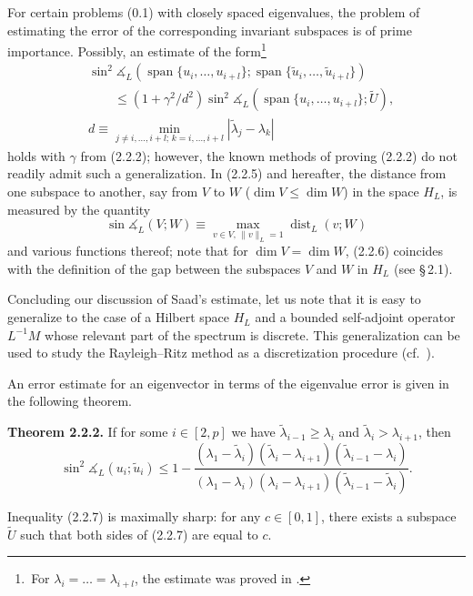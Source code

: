 \documentclass[11pt,oneside]{book}
\newcommand{\myspan}{\operatorname{span}}
\newcommand{\ang}{\measuredangle}
\begin{document}
For certain problems (0.1) with closely spaced eigenvalues, the problem of estimating the error of the corresponding invariant subspaces is of prime importance. %
Possibly, an estimate of the form\begingroup\renewcommand{\thefootnote}{*)}\footnote{\,For $\lambda_i = \ldots = \lambda_{i+l}$, the estimate was proved in \citep{Saad1980}.}\endgroup
\[
\begin{aligned}
&\sin^2 \ang_L(\myspan\{u_i, \ldots, u_{i+l}\}; \myspan\{\tilde{u}_i, \ldots, \tilde{u}_{i+l}\}) \\
&\qquad \leqslant (1 + \gamma^2 / d^2) \sin^2 \ang_L(\myspan\{u_i, \ldots, u_{i+l}\}; \widetilde{U}), \\
&d \equiv \min_{j \neq i, \ldots, i+l; \, k = i, \ldots, i+l} | \tilde{\lambda}_j - \lambda_k |
\end{aligned}
\tag{2.2.5}
\]
holds with $\gamma$ from (2.2.2); however, the known methods of proving (2.2.2) do not readily admit such a generalization. In (2.2.5) and hereafter, the distance from one subspace to another, say from $V$ to $W$ ($\dim V \leqslant \dim W$) in the space $H_L$, is measured by the quantity
\[
\sin \ang_L(V; W) \equiv \max_{v \in V, \, \|v\|_L = 1} \operatorname{dist}_L(v; W) \tag{2.2.6}
\]
and various functions thereof; note that for $\dim V = \dim W$, (2.2.6) coincides with the definition of the gap between the subspaces $V$ and $W$ in $H_L$ (see \S\,2.1). %

Concluding our discussion of Saad's estimate, let us note that it is easy to generalize to the case of a Hilbert space $H_L$ and a bounded self-adjoint operator $L^{-1}M$ whose relevant part of the spectrum is discrete. This generalization can be used to study the Rayleigh--Ritz method as a discretization procedure (cf.\ \citep{Krasnoselskii1969}).

An error estimate for an eigenvector in terms of the eigenvalue error is given in the following theorem.

\textbf{Theorem 2.2.2.} If for some $i \in [2, p]$ we have $\tilde{\lambda}_{i-1} \geqslant \lambda_i$ and $\tilde{\lambda}_i > \lambda_{i+1}$, then
\[
\sin^2 \ang_L(u_i; \tilde{u}_i) \leqslant 1 - \frac{(\lambda_1 - \tilde{\lambda}_i)(\tilde{\lambda}_i - \lambda_{i+1})(\tilde{\lambda}_{i-1} - \lambda_i)}{(\lambda_1 - \lambda_i)(\lambda_i - \lambda_{i+1})(\tilde{\lambda}_{i-1} - \tilde{\lambda}_i)} . \tag{2.2.7}
\]

Inequality (2.2.7) is maximally sharp: for any $c \in [0, 1]$, there exists a subspace $\widetilde{U}$ such that both sides of (2.2.7) are equal to $c$. %
\end{document}
